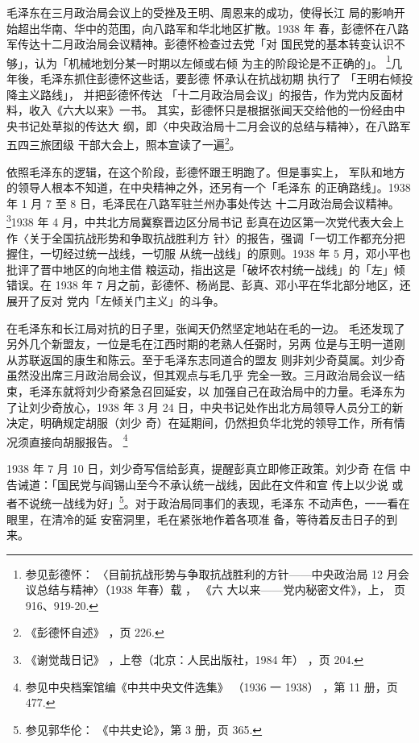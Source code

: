 毛泽东在三月政治局会议上的受挫及王明、周恩来的成功，使得长江 局的影响开
始超出华南、华中的范围，向八路军和华北地区扩散。1938 年 春，彭德怀在八路
军传达十二月政治局会议精神。彭德怀检查过去党「对 国民党的基本转变认识不
够」，认为「机械地划分某一时期以左倾或右倾 为主的阶段论是不正确的」。
\footnote{参见彭德怀： 〈目前抗战形势与争取抗战胜利的方针——中央政治局 12
月会议总结与精神〉（1938 年春）载 ， 《六 大以来——党内秘密文件》，上，
页 916、919-20.}几年後，毛泽东抓住彭德怀这些话，要彭德 怀承认在抗战初期
执行了 「王明右倾投降主义路线」， 并把彭德怀传达
「十二月政治局会议」的报告，作为党内反面材料，收入《六大以来》一书。
其实，彭德怀只是根据张闻天交给他的一份经由中央书记处草拟的传达大
纲，即〈中央政治局十二月会议的总结与精神〉，在八路军五四三旅团级
干部大会上，照本宣读了一遍\footnote{《彭德怀自述》
，页 226.}。

依照毛泽东的逻辑，在这个阶段，彭德怀跟王明跑了。但是事实上，
军队和地方的领导人根本不知道，在中央精神之外，还另有一个「毛泽东
的正确路线」。1938 年 1 月 7 至 8 日，毛泽民在八路军驻兰州办事处传达
十二月政治局会议精神。\footnote{《谢觉哉日记》
，上卷（北京：人民出版社，1984 年）
，页 204.}1938 年 4 月，中共北方局冀察晋边区分局书记
彭真在边区第一次党代表大会上作〈关于全国抗战形势和争取抗战胜利方
针〉的报告，强调「一切工作都充分把握住，一切经过统一战线，一切服
从统一战线」的原则。1938 年 5 月，邓小平也批评了晋中地区的向地主借
粮运动，指出这是「破坏农村统一战线」的「左」倾错误。在 1938 年 7
月之前，彭德怀、杨尚昆、彭真、邓小平在华北部分地区，还展开了反对
党内「左倾关门主义」的斗争。

在毛泽东和长江局对抗的日子里，张闻天仍然坚定地站在毛的一边。
毛还发现了另外几个新盟友，一位是毛在江西时期的老熟人任弼时，另两
位是与王明一道刚从苏联返国的康生和陈云。至于毛泽东志同道合的盟友
则非刘少奇莫属。刘少奇虽然没出席三月政治局会议，但其观点与毛几乎
完全一致。三月政治局会议一结束，毛泽东就将刘少奇紧急召回延安，以
加强自己在政治局中的力量。毛泽东为了让刘少奇放心，1938 年 3 月 24
日，中央书记处作出北方局领导人员分工的新决定，明确规定胡服（刘少
奇）在延期间，仍然担负华北党的领导工作，所有情况须直接向胡服报告。
\footnote{参见中央档案馆编《中共中央文件选集》
（1936 一 1938）
，第 11 册，页 477.}

1938 年 7 月 10 日，刘少奇写信给彭真，提醒彭真立即修正政策。刘少奇 在信
中告诫道：「国民党与阎锡山至今不承认统一战线，因此在文件和宣 传上以少说
或者不说统一战线为好」\footnote{参见郭华伦： 《中共史论》，第 3 册，页
365.}。对于政治局同事们的表现，毛泽东 不动声色，一一看在眼里，在清冷的延
安窑洞里，毛在紧张地作着各项准 备，等待着反击日子的到来。

